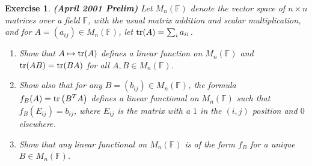 \documentclass[10pt]{book}
\newtheorem{exercise}{Exercise}[section]
\theoremstyle{definition}
\numberwithin{equation}{chapter}
\begin{document}
\begin{exercise}{\bf (April 2001 Prelim)}
Let $M_n(\mathbb{F})$ denote the vector space of $n \times n$ matrices over a field $\mathbb{F}$, with the usual matrix addition and scalar multiplication, and for $A = \left(a_{ij}\right) \in M_n(\mathbb{F})$, let ${\rm tr}(A) = \sum_i a_{ii}$.
\begin{enumerate}[label=(\alph*)]
    \item Show that $A \mapsto {\rm tr}(A)$ defines a linear function on $M_n(\mathbb{F})$ and ${\rm tr}(AB) = {\rm tr}(BA)$ for all $A, B \in M_n(\mathbb{F})$.
    
    \item Show also that for any $B = \left(b_{ij}\right) \in M_n(\mathbb{F})$, the formula $f_B(A) = {\rm tr}\left(B^T A\right)$ defines a linear functional on $M_n(\mathbb{F})$ such that $f_B(E_{ij}) = b_{ij}$, where $E_{ij}$ is the matrix with a $1$ in the $(i,j)$ position and $0$ elsewhere.
    
    \item Show that any linear functional on $M_n(\mathbb{F})$ is of the form $f_B$ for a unique $B \in M_n(\mathbb{F})$.
\end{enumerate}
\end{exercise}
\end{document}
